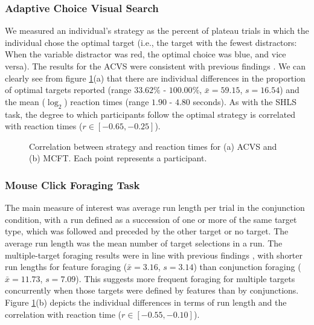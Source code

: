 \documentclass[a4paper, man, natbib, floatsintext]{apa6}
\begin{document}
\subsubsection{Adaptive Choice Visual Search}
 
We measured an individual's strategy as the percent of plateau trials in which the individual chose the optimal target (i.e., the target with the fewest distractors: When the variable distractor was red, the optimal choice was blue, and vice versa). The results for the ACVS were consistent with previous findings  \citep{irons-leber2016,irons-leber2018}. We can clearly see from figure \ref{fig:acvs_mcft_summary}(a) that there are individual differences in the proportion of optimal targets reported (range $33.62\%$ - $100.00\%$, $\bar{x} = 59.15$, $s = 16.54$) and the mean ($\log_2$) reaction times (range $1.90$ - $4.80$ seconds). As with the SHLS task, the degree to which participants follow the optimal strategy is correlated with reaction times ($r \in [-0.65, -0.25]$).

\begin{figure}
\centering
{}
\caption{Correlation between strategy and reaction times for (a) ACVS and (b) MCFT. Each point represents a participant.}
\label{fig:acvs_mcft_summary}
\end{figure}

\subsubsection{Mouse Click Foraging Task}
 
The main measure of interest was average run length per trial in the conjunction condition, with a run defined as a succession of one or more of the same target type, which was followed and preceded by the other target or no target. The average run length was the mean number of target selections in a run. The multiple-target foraging results were in line with previous findings  \citep{kristjansson2014,johannesson2016}, with shorter run lengths for feature foraging ($\bar{x} = 3.16$, $s = 3.14$) than conjunction foraging ($\bar{x} = 11.73$, $s = 7.09$). This suggests more frequent foraging for multiple targets concurrently when those targets were defined by features than by conjunctions. Figure \ref{fig:acvs_mcft_summary}(b) depicts the individual differences in terms of run length and the correlation with reaction time ($r \in [-0.55, -0.10]$).
\end{document}
